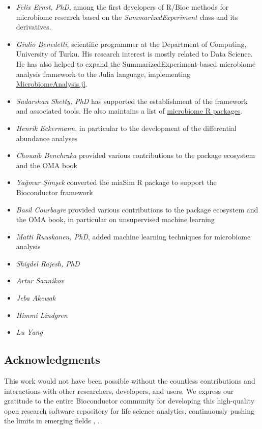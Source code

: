 \documentclass[
]{book}
\begin{document}
\begin{itemize}
\item
  \emph{Felix Ernst, PhD}, among the first developers of R/Bioc methods for
  microbiome research based on the \emph{SummarizedExperiment} class and
  its derivatives.
\item
  \emph{Giulio Benedetti}, scientific programmer at the Department of
  Computing, University of Turku. His research interest is mostly
  related to Data Science. He has also helped to expand the
  SummarizedExperiment-based microbiome analysis framework to the
  Julia language, implementing
  \href{https://github.com/JuliaTurkuDataScience/MicrobiomeAnalysis.jl}{MicrobiomeAnalysis.jl}.
\item
  \emph{Sudarshan Shetty, PhD} has supported the establishment of the
  framework and associated tools. He also maintains a list of
  \href{https://microsud.github.io/Tools-Microbiome-Analysis/}{microbiome R
  packages}.
\item
  \emph{Henrik Eckermann}, in particular to the development of
  the differential abundance analyses
\item
  \emph{Chouaib Benchraka} provided various contributions to the package ecosystem and the OMA book
\item
  \emph{Yağmur Şimşek} converted the miaSim R package to support the Bioconductor framework
\item
  \emph{Basil Courbayre} provided various contributions to the package
  ecosystem and the OMA book, in particular on unsupervised machine
  learning
\item
  \emph{Matti Ruuskanen, PhD}, added machine learning techniques for
  microbiome analysis
\item
  \emph{Shigdel Rajesh, PhD}
\item
  \emph{Artur Sannikov}
\item
  \emph{Jeba Akewak}
\item
  \emph{Himmi Lindgren}
\item
  \emph{Lu Yang}
\end{itemize}

\hypertarget{acknowledgments}{%
\subsection*{Acknowledgments}\label{acknowledgments}}

This work would not have been possible without the countless
contributions and interactions with other researchers, developers, and
users. We express our gratitude to the entire Bioconductor community
for developing this high-quality open research software repository for
life science analytics, continuously pushing the limits in emerging
fields \citep{Gentleman2004}, \citep{Huber2015}.
\end{document}
